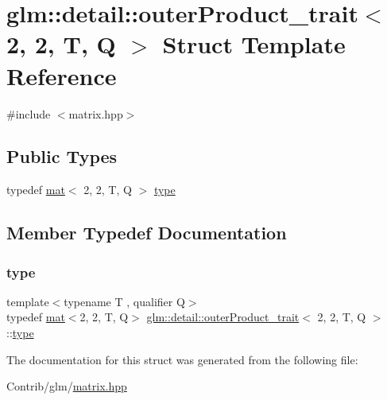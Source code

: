 \hypertarget{structglm_1_1detail_1_1outer_product__trait_3_012_00_012_00_01_t_00_01_q_01_4}{}\section{glm\+:\+:detail\+:\+:outer\+Product\+\_\+trait$<$ 2, 2, T, Q $>$ Struct Template Reference}
\label{structglm_1_1detail_1_1outer_product__trait_3_012_00_012_00_01_t_00_01_q_01_4}


{\ttfamily \#include $<$matrix.\+hpp$>$}

\subsection*{Public Types}
\begin{DoxyCompactItemize}
\item 
typedef \mbox{\hyperlink{structglm_1_1mat}{mat}}$<$ 2, 2, T, Q $>$ \mbox{\hyperlink{structglm_1_1detail_1_1outer_product__trait_3_012_00_012_00_01_t_00_01_q_01_4_a28a25a20b2ff9729f6fb60728dc8a305}{type}}
\end{DoxyCompactItemize}


\subsection{Member Typedef Documentation}
\mbox{\label{structglm_1_1detail_1_1outer_product__trait_3_012_00_012_00_01_t_00_01_q_01_4_a28a25a20b2ff9729f6fb60728dc8a305}} 
\subsubsection{\texorpdfstring{type}{type}}
{\footnotesize\ttfamily template$<$typename T , qualifier Q$>$ \\
typedef \mbox{\hyperlink{structglm_1_1mat}{mat}}$<$2, 2, T, Q$>$ \mbox{\hyperlink{structglm_1_1detail_1_1outer_product__trait}{glm\+::detail\+::outer\+Product\+\_\+trait}}$<$ 2, 2, T, Q $>$\+::\mbox{\hyperlink{structglm_1_1detail_1_1outer_product__trait_3_012_00_012_00_01_t_00_01_q_01_4_a28a25a20b2ff9729f6fb60728dc8a305}{type}}}



The documentation for this struct was generated from the following file\+:\begin{DoxyCompactItemize}
\item 
Contrib/glm/\mbox{\hyperlink{matrix_8hpp}{matrix.\+hpp}}\end{DoxyCompactItemize}
